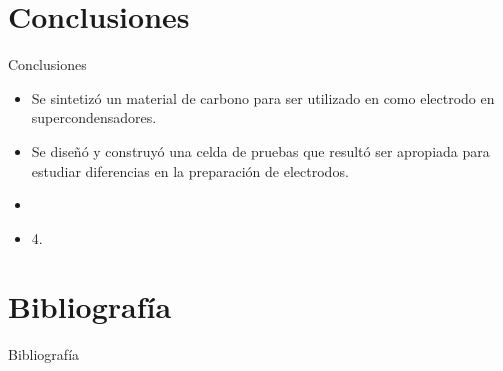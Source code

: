 \documentclass[aspectratio=169]{beamer}
\begin{document}
	\section{Conclusiones}
	\begin{frame}{Conclusiones}
		\begin{itemize}[<+>]
			\item Se sintetizó un material de carbono para ser utilizado en como electrodo en supercondensadores.
			\item Se diseñó y construyó una celda de pruebas que resultó ser apropiada para	estudiar diferencias en la preparación de electrodos.
			\item 
			\item 4.
		\end{itemize}
	\end{frame}

	

	\section{Bibliografía}
	\begin{frame}[allowframebreaks]{Bibliografía}
		
		
		
	\end{frame}

	\maketitle
\end{document}
